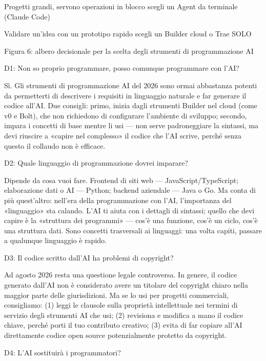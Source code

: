 Progetti grandi, servono operazioni in blocco scegli un Agent da terminale (Claude Code)

Validare un'idea con un prototipo rapido scegli un Builder cloud o Trae SOLO

\begin{center}\small\color{gray}Figura 6: albero decisionale per la scelta degli strumenti di programmazione AI\end{center}


D1: Non so proprio programmare, posso comunque programmare con l'AI?

Sì. Gli strumenti di programmazione AI del 2026 sono ormai abbastanza potenti da permetterti di descrivere i requisiti in linguaggio naturale e far generare il codice all'AI. Due consigli: primo, inizia dagli strumenti Builder nel cloud (come v0 e Bolt), che non richiedono di configurare l'ambiente di sviluppo; secondo, impara i concetti di base mentre li usi — non serve padroneggiare la sintassi, ma devi riuscire a «capire nel complesso» il codice che l'AI scrive, perché senza questo il collaudo non è efficace.

D2: Quale linguaggio di programmazione dovrei imparare?

Dipende da cosa vuoi fare. Frontend di siti web — JavaScript/TypeScript; elaborazione dati o AI — Python; backend aziendale — Java o Go. Ma conta di più quest'altro: nell'era della programmazione con l'AI, l'importanza del «linguaggio» sta calando. L'AI ti aiuta con i dettagli di sintassi; quello che devi capire è la «struttura dei programmi» — cos'è una funzione, cos'è un ciclo, cos'è una struttura dati. Sono concetti trasversali ai linguaggi: una volta capiti, passare a qualunque linguaggio è rapido.

D3: Il codice scritto dall'AI ha problemi di copyright?

Ad agosto 2026 resta una questione legale controversa. In genere, il codice generato dall'AI non è considerato avere un titolare del copyright chiaro nella maggior parte delle giurisdizioni. Ma se lo usi per progetti commerciali, consigliamo: (1) leggi le clausole sulla proprietà intellettuale nei termini di servizio degli strumenti AI che usi; (2) revisiona e modifica a mano il codice chiave, perché porti il tuo contributo creativo; (3) evita di far copiare all'AI direttamente codice open source potenzialmente protetto da copyright.

D4: L'AI sostituirà i programmatori?

